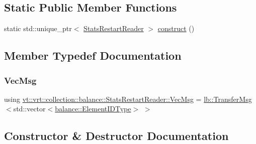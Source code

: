 \subsection*{Static Public Member Functions}
\begin{DoxyCompactItemize}
\item 
static std\+::unique\+\_\+ptr$<$ \hyperlink{structvt_1_1vrt_1_1collection_1_1balance_1_1_stats_restart_reader}{Stats\+Restart\+Reader} $>$ \hyperlink{structvt_1_1vrt_1_1collection_1_1balance_1_1_stats_restart_reader_a5030b1f5ce0f67af68ca4ac43d7f3bd9}{construct} ()
\end{DoxyCompactItemize}


\subsection{Member Typedef Documentation}
\mbox{\label{structvt_1_1vrt_1_1collection_1_1balance_1_1_stats_restart_reader_a7e2a74977e595242bf3abb6c83b7e27b}} 
\subsubsection{\texorpdfstring{Vec\+Msg}{VecMsg}}
{\footnotesize\ttfamily using \hyperlink{structvt_1_1vrt_1_1collection_1_1balance_1_1_stats_restart_reader_a7e2a74977e595242bf3abb6c83b7e27b}{vt\+::vrt\+::collection\+::balance\+::\+Stats\+Restart\+Reader\+::\+Vec\+Msg} =  \hyperlink{structvt_1_1vrt_1_1collection_1_1lb_1_1_transfer_msg}{lb\+::\+Transfer\+Msg}$<$std\+::vector$<$\hyperlink{namespacevt_1_1vrt_1_1collection_1_1balance_a14c8d2c972f2913aa3f1636e5be0a120}{balance\+::\+Element\+I\+D\+Type}$>$ $>$}



\subsection{Constructor \& Destructor Documentation}
\mbox{\label{structvt_1_1vrt_1_1collection_1_1balance_1_1_stats_restart_reader_a6813a4a484008c90cc12fb384e20f8c1}} 
